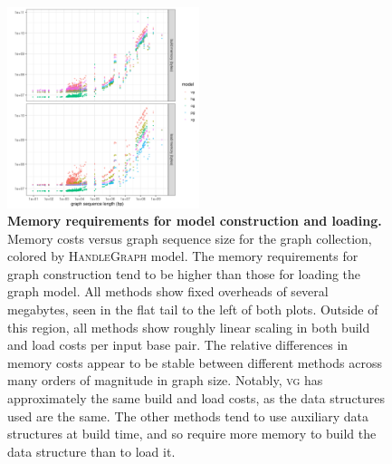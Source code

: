 \documentclass{bioinfo}
\begin{document}
\begin{figure}
  \centering
  \includegraphics[width=0.5\textwidth]{figures/build_and_load_memory.png}
  \caption{
    \label{fig:prof1}
    \textbf{Memory requirements for model construction and loading.}
    Memory costs versus graph sequence size for the graph collection, colored by \textsc{HandleGraph} model.
    The memory requirements for graph construction tend to be higher than those for loading the graph model.
    All methods show fixed overheads of several megabytes, seen in the flat tail to the left of both plots.
    Outside of this region, all methods show roughly linear scaling in both build and load costs per input base pair.
    The relative differences in memory costs appear to be stable between different methods across many orders of magnitude in graph size.
    Notably, \textsc{vg} has approximately the same build and load costs, as the data structures used are the same.
    The other methods tend to use auxiliary data structures at build time, and so require more memory to build the data structure than to load it.
    }
\end{figure}
\end{document}
